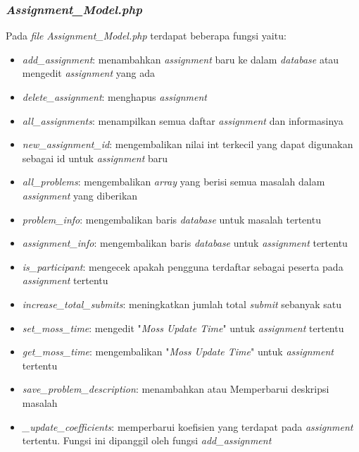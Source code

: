 \subsubsection{\textit{Assignment\_Model.php}}
Pada \textit{file} \textit{Assignment\_Model.php} terdapat beberapa fungsi yaitu:
\begin{itemize}
	\item \textit{add\_assignment}: menambahkan \textit{assignment} baru ke dalam \textit{database} atau mengedit \textit{assignment} yang ada
	\item \textit{delete\_assignment}: menghapus \textit{assignment} 
	\item \textit{all\_assignments}: menampilkan semua daftar \textit{assignment} dan informasinya
	\item \textit{new\_assignment\_id}: mengembalikan nilai int terkecil yang dapat digunakan sebagai id untuk \textit{assignment} baru
	\item \textit{all\_problems}: mengembalikan \textit{array} yang berisi semua masalah dalam \textit{assignment} yang diberikan
	\item \textit{problem\_info}: mengembalikan baris \textit{database} untuk masalah tertentu
	\item \textit{assignment\_info}: mengembalikan baris \textit{database} untuk \textit{assignment} tertentu
	\item \textit{is\_participant}: mengecek apakah pengguna terdaftar sebagai peserta pada \textit{assignment} tertentu
	\item \textit{increase\_total\_submits}: meningkatkan jumlah total \textit{submit} sebanyak satu
	\item \textit{set\_moss\_time}: mengedit "\textit{Moss Update Time}" untuk \textit{assignment} tertentu
	\item \textit{get\_moss\_time}: mengembalikan "\textit{Moss Update Time}" untuk \textit{assignment} tertentu
	\item \textit{save\_problem\_description}: menambahkan atau Memperbarui deskripsi masalah
	\item \textit{\_update\_coefficients}: memperbarui koefisien yang terdapat pada \textit{assignment} tertentu. Fungsi ini dipanggil oleh fungsi \textit{add\_assignment}
\end{itemize}

